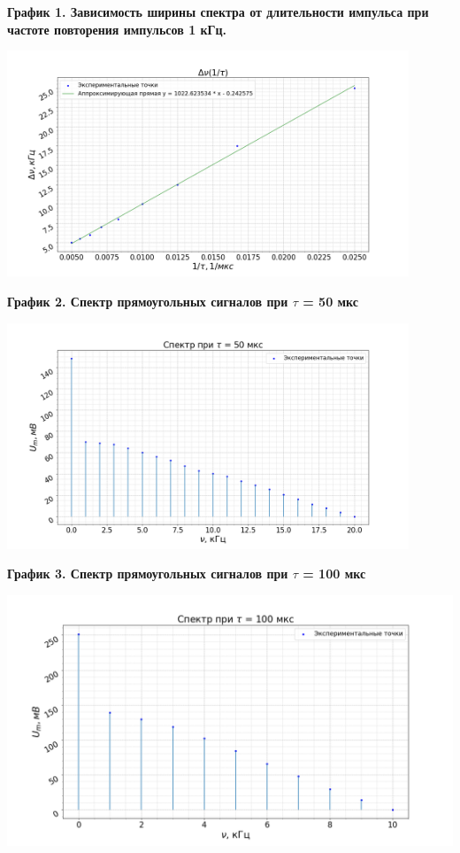 \documentclass[15pt,a5paper,reqno]{article}
\begin{document}
        \noindent\hypertarget{graph_1}{\textbf{График 1. Зависимость ширины спектра от длительности импульса при частоте повторения импульсов 1 кГц.}}
        \begin{center}
            \includegraphics[width = 0.9\textwidth]{images/graph_1.png}
        \end{center}

        \noindent\hypertarget{graph_2}{\textbf{График 2. Спектр прямоугольных сигналов при $\tau$ = 50 мкс}}
        \begin{center}
            \includegraphics[width = 0.9\textwidth]{images/graph_2.png}
        \end{center}

        \noindent\hypertarget{graph_3}{\textbf{График 3. Спектр прямоугольных сигналов при $\tau$ = 100 мкс}}
        \begin{center}
            \includegraphics[width = \textwidth]{images/graph_3.png}
        \end{center}
\end{document}
